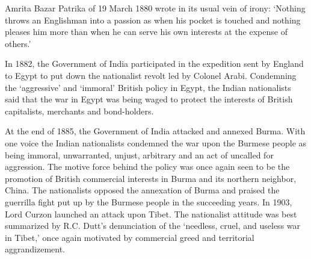 Amrita Bazar Patrika of 19 March 1880 wrote in its usual vein of irony: `Nothing throws an Englishman into a passion as when his pocket is touched and nothing pleases him more than when he can serve his own interests at the expense of others.' 

In 1882, the Government of India participated in the expedition sent by England to Egypt to put down the nationalist revolt led by Colonel Arabi. Condemning the `aggressive' and `immoral' British policy in Egypt, the Indian nationalists said that the war in Egypt was being waged to protect the interests of British capitalists, merchants and bond-holders. 

At the end of 1885, the Government of India attacked and annexed Burma. With one voice the Indian nationalists condemned the war upon the Burmese people as being immoral, unwarranted, unjust, arbitrary and an act of uncalled for aggression. The motive force behind the policy was once again seen to be the promotion of British commercial interests in Burma and its northern neighbor, China. The nationalists opposed the annexation of Burma and praised the guerrilla fight put up by the Burmese people in the succeeding years. In 1903, Lord Curzon launched an attack upon Tibet. The nationalist attitude was best summarized by R.C. Dutt's denunciation of the `needless, cruel, and useless war in Tibet,' once again motivated by commercial greed and territorial aggrandizement. 

